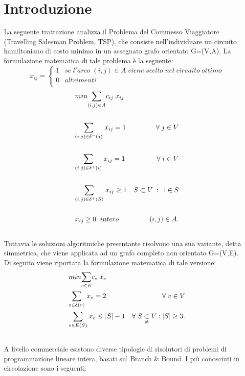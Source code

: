 \chapter{Introduzione}
La seguente trattazione analizza il Problema del Commesso Viaggiatore (Travelling Salesman Problem, TSP), che consiste nell'individuare un circuito hamiltoniano di costo minimo in un assegnato grafo orientato G=(V,A)\cite{TSP}. La formulazione matematica di tale problema è la seguente:
$$
x_{ij}=
\begin{cases}
1 & se\;l'arco\;(i,j)\in A\;viene\;scelto\;nel\;circuito\;ottimo\\
0 & altrimenti\\
\end{cases}
$$
\begin{align}
& min \underset{(i,j)\in A}\sum{c_{ij}\;x_{ij}} \\\notag \\
& \underset{(i,j)\in \delta^{-}(j)}\sum{\;x_{ij}} = 1 & \forall\;j\in V \\\notag \\
& \underset{(i,j)\in \delta^{+}(i)}\sum{\;x_{ij}} = 1 & \forall\;i\in V \\\notag \\
& \underset{(i,j)\in \delta^{+}(S)}\sum{\;x_{ij}} \geq 1 & S \subset V\; :\; 1\in S\\\notag \\
& x_{ij}\geq 0\;\; intero & (i,j)\in A.\\\notag
\end{align}
Tuttavia le soluzioni algoritmiche presentante risolvono una sua variante, detta simmetrica, che viene applicata ad un grafo completo non orientato G=(V,E).\\ Di seguito viene riportata la formulazione matematica di tale versione:\\
\begin{align}
& min \underset{e\in E}\sum{c_e\;x_e}\\
& \underset{e\in \delta(v)}\sum{\;x_e} = 2 & \forall\;v\in V \\
& \underset{e\in E(S)}\sum{\;x_e} \leq \vert S\vert - 1 & \forall\;S\underset{\neq} \subset V: \vert S\vert\geq 3.\\\notag
\end{align}
A livello commerciale esistono diverse tipologie di risolutori di problemi di programmazione lineare intera, basati sul Branch \& Bound. I più conosciuti in circolazione sono i seguenti:
